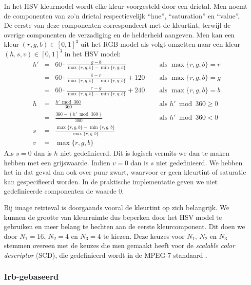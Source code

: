 In het HSV kleurmodel \cite{tkalcic:colour_spaces} wordt elke kleur voorgesteld door een drietal. Men noemt de componenten van 
zo'n drietal respectievelijk ``hue'', ``saturation'' en ``value''. De eerste van deze componenten
correspondeert met de kleurtint, terwijl de overige componenten de verzadiging en de helderheid
aangeven. Men kan een kleur $(r,g,b) \in [0,1]^3$ uit het RGB model als volgt omzetten naar een 
kleur $(h,s,v) \in [0,1]^3$ in het HSV model:
$$
\begin{array}{rcll}
h' & = & 60 \cdot \frac{g - b}{\max \{r,g,b\} - \min \{r,g,b\}}\quad & \textrm{ als } \max \{r,g,b\} = r \\[2pt]
  & = & 60 \cdot \frac{b - r}{\max \{r,g,b\} - \min \{r,g,b\}} + 120\quad & \textrm{ als } \max \{r,g,b\} = g \\[2pt]
  & = & 60 \cdot \frac{r - g}{\max \{r,g,b\} - \min \{r,g,b\}} + 240\quad & \textrm{ als } \max \{r,g,b\} = b \\[6pt]
h & = & \frac{h' \bmod 360}{360} & \textrm{ als } h' \bmod 360 \geq 0 \\[2pt]
  & = & \frac{360 - (h' \bmod 360)}{360} & \textrm{ als } h' \bmod 360 < 0 \\[6pt]
s & = & \frac{\max \{r,g,b\} - \min \{r,g,b\}}{\max \{r,g,b\}} & \\[6pt]
v & = & \max \{r,g,b\}
\end{array}
$$
Als $s=0$ dan is $h$ niet gedefinieerd. Dit is logisch vermits we dan te maken hebben met een 
grijswaarde. Indien $v=0$ dan is $s$ niet gedefinieerd. We hebben het in dat geval dan ook over 
puur zwart, waarvoor er geen kleurtint of saturatie kan gespecifieerd worden. In de praktische
implementatie geven we niet gedefinieerde componenten de waarde $0$.

Bij image retrieval is doorgaands vooral de kleurtint op zich belangrijk. We kunnen de 
grootte van kleurruimte dus
beperken door het HSV model te gebruiken en meer belang te hechten aan de
eerste kleurcomponent. Dit doen we door $N_1=16$, $N_2=4$ en $N_3=4$ te kiezen.
Deze keuzes voor $N_1$, $N_2$ en $N_3$ stemmen overeen met de keuzes die men gemaakt
heeft voor de \emph{scalable color descriptor} (SCD), die gedefinieerd wordt in de MPEG-7
standaard \cite{manjunath:color_and_texture_descriptors}.

\subsubsection{Irb-gebaseerd}

